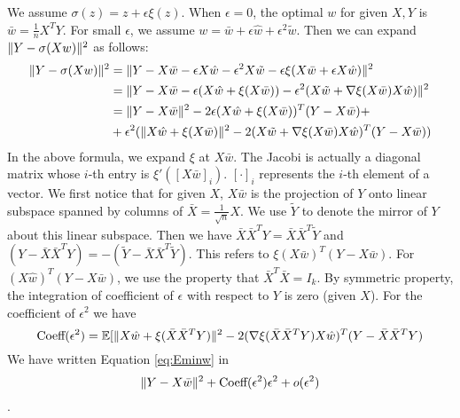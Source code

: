 \documentclass{article}
\DeclarePairedDelimiter\norm{\lVert}{\rVert}
\def\E{\mathbb{E}}
\begin{document}
We assume $\sigma(z) = z + \epsilon \xi(z)$. When $\epsilon = 0$, the optimal $w$ for given $X, Y$ is 
$\bar{w} = \frac{1}{n}X^T Y $. For small $\epsilon$, we assume $ w = \bar{w} + \epsilon \hat{w} + \epsilon^2 \tilde{w}$. Then we can expand $\norm{Y - \sigma (X w ) }^2$ as follows:
\begin{align*}
\norm{Y - \sigma (X w ) }^2 & = \norm{Y - X \bar{w} - \epsilon X \hat{w} - \epsilon^2 X \tilde{w} - \epsilon \xi(X \bar{w} + \epsilon X\hat{w}) }^2 \\
& = \norm{ Y - X  \bar{w}  - \epsilon (X\hat{w} + \xi(X \bar{w} )) - \epsilon^2(X\tilde{w} + \nabla \xi(X \bar{w} )X\hat{w})}^2 \\
& = \norm{Y-X \bar{w}  }^2 - 2 \epsilon (X \hat{w} + \xi(X \bar{w}))^T (Y-X \bar{w}) +\\
& +\epsilon^2(\norm{X\hat{w} + \xi(X \bar{w})}^2 - 2 (X \tilde{w}+ \nabla \xi(X \bar{w})X\hat{w})^T(Y-X \bar{w}))
\end{align*}
In the above formula,  we expand $\xi$ at $X \bar{w}$. The Jacobi is actually a diagonal matrix whose $i$-th entry is $\xi'([X\bar{w}]_i)$. $[\cdot]_i$ represents the $i$-th element of a vector.
We first notice that for given $X$, $X\bar{w}$ is the projection of $Y$ onto linear subspace spanned by columns of $\bar{X} = \frac{1}{\sqrt{n}}X$. We use $\tilde{Y}$ to denote the mirror of $Y$ about this linear subspace. Then we have
$\bar{X}\bar{X}^T Y = \bar{X}\bar{X}^T \tilde{Y}$ and $(Y- \bar{X}\bar{X}^TY) = -(\tilde{Y} - \bar{X}\bar{X}^T \tilde{Y})$. This refers to $\xi(X\bar{w})^T (Y-X\bar{w})$. For $(X\hat{w})^T (Y-X\bar{w})$, we use the property that $  \bar{X}^T \bar{X} = I_k$.
By symmetric property, the integration of coefficient of $\epsilon$ with respect to $Y$ is zero (given $X$). 
 For the coefficient of $\epsilon^2$ we have
\begin{equation*}
\textrm{Coeff}(\epsilon^2)  =  \E[\norm{X\hat{w} + \xi(\bar{X}\bar{X}^TY)}^2 - 2 (\nabla \xi(\bar{X}\bar{X}^TY)X\hat{w})^T(Y-\bar{X}\bar{X}^TY)
\end{equation*}
We have written Equation \eqref{eq:Eminw} in $$ \norm{Y - X \bar{w}}^2 + \textrm{Coeff}(\epsilon^2) \epsilon^2 + o(\epsilon^2)$$.
\end{document}
